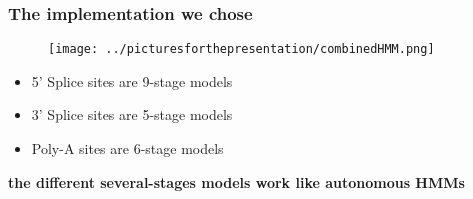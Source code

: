 \documentclass{beamer}
\begin{document}
\begin{frame}
\frametitle{The implementation we chose}
	\begin{figure}
	\texttt{[image: ../picturesforthepresentation/combinedHMM.png]}
	\end{figure}
	
	\begin{itemize}
		\item 5' Splice sites are 9-stage models
		\item 3' Splice sites are 5-stage models
		\item Poly-A sites are 6-stage models 
	\end{itemize}
	
	\pause\begin{center}
		\textbf{the different several-stages models work like autonomous HMMs}
	\end{center}
	
\end{frame}
\end{document}
